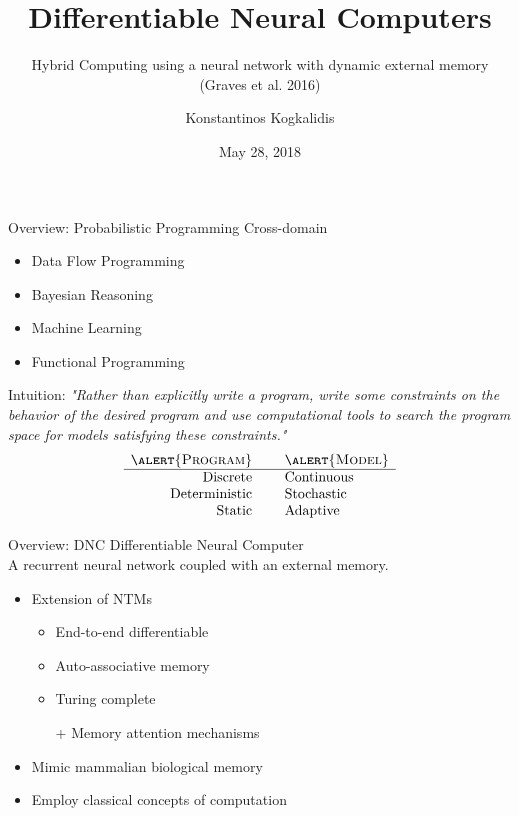 \documentclass{beamer}
\title{Differentiable Neural Computers}
\subtitle{Hybrid Computing using a neural network with dynamic external memory (Graves et al. 2016)}
\author{Konstantinos Kogkalidis}
\date{May 28, 2018}
\institute{Logic and Computation}
\begin{document}
	\maketitle
	
\begin{frame}{Overview: Probabilistic Programming}
	\alert{Cross-domain}
	\begin{itemize}
	\item Data Flow Programming
	\item Bayesian Reasoning
	\item Machine Learning
	\item Functional Programming
	\end{itemize}
	\pause
	Intuition:
	\textit{"Rather than explicitly write a program, write some \alert{constraints} on the behavior of the desired program and use computational tools to search the program space for \alert{models} satisfying these constraints."}
	\pause
	\[\begin{array}{rcl}
	\textsc{\alert{Program}} &\ & \textsc{\alert{Model}}\\
	\hline
	\text{Discrete} &\ & \text{Continuous}\\
	\text{Deterministic} &\ & \text{Stochastic}\\
	\text{Static} &\ & \text{Adaptive}\\
	\end{array}\]
\end{frame}

\begin{frame}{Overview: DNC}
	\alert{Differentiable Neural Computer}\\
	A recurrent neural network coupled with an external memory.
	
	\pause
	\begin{itemize}
	\item Extension of NTMs
	\begin{itemize}
		\pause
		\item End-to-end differentiable
		\pause
		\item Auto-associative memory
		\pause
		\item Turing complete
		\pause
		\item[+] Memory attention mechanisms
		\end{itemize}
	\pause
	\item Mimic mammalian biological memory
	\item Employ classical concepts of computation
	\end{itemize}
\end{frame}
\end{document}
